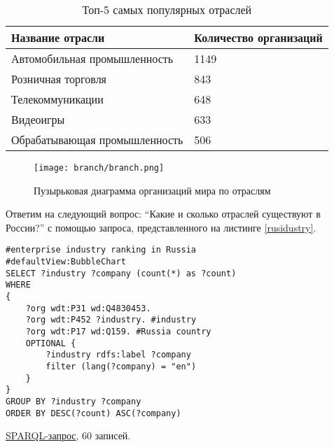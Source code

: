 \begin{table}[h]
\centering
\begin{tabular}{|l|l|}
\hline
\textbf{Название отрасли} & \textbf{Количество организаций} \\
\hline
Автомобильная промышленность & 1149 \\	
\hline
Розничная торговля & 843 \\
\hline
Телекоммуникации & 648 \\
\hline
Видеоигры & 633 \\
\hline
Обрабатывающая промышленность & 506 \\
\hline
\end{tabular}
\caption{Топ-5 самых популярных отраслей}
\label{topindustry}
\end{table}


\begin{figure}[h]
	\texttt{[image: branch/branch.png]}
	\centering
	\caption{Пузырьковая диаграмма организаций мира по отраслям}
	\centering
	\label{industrygraph}
\end{figure}

\newpage

Ответим на следующий вопрос: \enquote{Какие и сколько отраслей существуют в России?} с помощью запроса, представленного на листинге \ref{rusidustry}.

\begin{lstlisting}[language=SPARQL,label=rusidustry,caption=Запрос на построение пузырьковой диаграммы распределения организаций по отраслям в России]
#enterprise industry ranking in Russia
#defaultView:BubbleChart
SELECT ?industry ?company (count(*) as ?count) 
WHERE 
{
    ?org wdt:P31 wd:Q4830453.
    ?org wdt:P452 ?industry. #industry
    ?org wdt:P17 wd:Q159. #Russia country
    OPTIONAL {
		?industry rdfs:label ?company
		filter (lang(?company) = "en")
	}
}
GROUP BY ?industry ?company
ORDER BY DESC(?count) ASC(?company)
\end{lstlisting}

\href{https://query.wikidata.org/#%23enterprise%20industry%20ranking%0A%23defaultView%3ABubbleChart%0ASELECT%20%3Findustry%20%3Fcompany%20%28count%28%2a%29%20as%20%3Fcount%29%20%0AWHERE%20%0A%7B%0A%20%20%20%20%3Forg%20wdt%3AP31%20wd%3AQ4830453.%0A%20%20%20%20%3Forg%20wdt%3AP452%20%3Findustry%20.%0A%20%20%20%20%3Forg%20wdt%3AP17%20wd%3AQ159.%20%23Russia%20country%0A%20%20%20%20OPTIONAL%20%7B%0A%09%09%3Findustry%20rdfs%3Alabel%20%3Fcompany%0A%09%09filter%20%28lang%28%3Fcompany%29%20%3D%20%22en%22%29%0A%09%7D%0A%7D%0AGROUP%20BY%20%3Findustry%20%3Fcompany%0AORDER%20BY%20DESC%28%3Fcount%29%20ASC%28%3Fcompany%29%0A}{SPARQL-запрос}, 60 записей.
	
